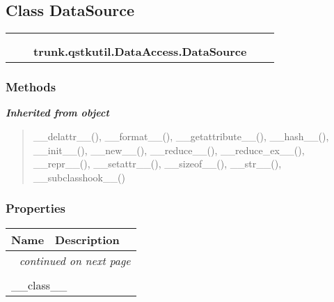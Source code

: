 \subsection{Class DataSource}

    \label{trunk:qstkutil:DataAccess:DataSource}
\begin{tabular}{cccccc}
\multicolumn{2}{r}{\settowidth{\BCL}{object}\multirow{2}{\BCL}{object}}
&&
  \\\cline{3-3}
  &&\multicolumn{1}{c|}{}
&&
  \\
&&\multicolumn{2}{l}{\textbf{trunk.qstkutil.DataAccess.DataSource}}
\end{tabular}



  \subsubsection{Methods}


\large{\textbf{\textit{Inherited from object}}}

\begin{quote}
\_\_delattr\_\_(), \_\_format\_\_(), \_\_getattribute\_\_(), \_\_hash\_\_(), \_\_init\_\_(), \_\_new\_\_(), \_\_reduce\_\_(), \_\_reduce\_ex\_\_(), \_\_repr\_\_(), \_\_setattr\_\_(), \_\_sizeof\_\_(), \_\_str\_\_(), \_\_subclasshook\_\_()
\end{quote}


  \subsubsection{Properties}

    \vspace{-1cm}
\hspace{\varindent}\begin{longtable}{|p{\varnamewidth}|p{\vardescrwidth}|l}
\cline{1-2}
\cline{1-2} \centering \textbf{Name} & \centering \textbf{Description}& \\
\cline{1-2}
\endhead\cline{1-2}\multicolumn{3}{r}{\small\textit{continued on next page}}\\\endfoot\cline{1-2}
\endlastfoot\multicolumn{2}{|l|}{\textit{Inherited from object}}\\
\multicolumn{2}{|p{\varwidth}|}{\raggedright \_\_class\_\_}\\
\cline{1-2}
\end{longtable}


